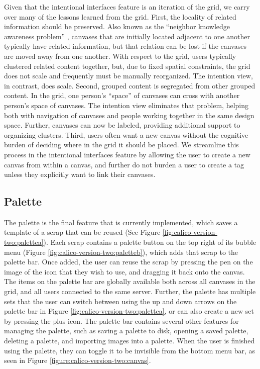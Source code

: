 Given that the intentional interfaces feature is an iteration of the grid, we carry over many of the lessons learned from the grid. First, the locality of related information should be preserved. Also known as the ``neighbor knowledge awareness problem'' \cite{dekel2007notation}, canvases that are initially located adjacent to one another typically have related information, but that relation can be lost if the canvases are moved away from one another. With respect to the grid, users typically clustered related content together, but, due to fixed spatial constraints, the grid does not scale and frequently must be manually reorganized. The intention view, in contrast, does scale. Second, grouped content is segregated from other grouped content. In the grid, one person’s ``space'' of canvases can cross with another person’s space of canvases. The intention view eliminates that problem, helping both with navigation of canvases and people working together in the same design space. Further, canvases can now be labeled, providing additional support to organizing clusters. Third, users often want a new canvas without the cognitive burden of deciding where in the grid it should be placed. We streamline this process in the intentional interfaces feature by allowing the user to create a new canvas from within a canvas, and further do not burden a user to create a tag unless they explicitly want to link their canvases.
  
\subsection{Palette}

The palette is the final feature that is currently implemented, which saves a template of a scrap that can be reused (See Figure \ref{fig:calico-version-two:palettea}). Each scrap contains a palette button on the top right of its bubble menu (Figure \ref{fig:calico-version-two:paletteb}), which adds that scrap to the palette bar. Once added, the user can reuse the scrap by pressing the pen on the image of the icon that they wish to use, and dragging it back onto the canvas. The items on the palette bar are globally available both across all canvases in the grid, and all users connected to the same server. Further, the palette has multiple sets that the user can switch between using the up and down arrows on the palette bar in Figure \ref{fig:calico-version-two:palettea}, or can also create a new set by pressing the plus icon. The palette bar contains several other features for managing the palette, such as saving a palette to disk, opening a saved palette, deleting a palette, and importing images into a palette. When the user is finished using the palette, they can toggle it to be invisible from the bottom menu bar, as seen in Figure \ref{figure:calico-version-two:canvas}.

